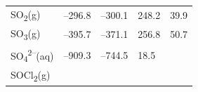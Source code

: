 \documentclass[
  9pt,
]{extbook}
\theoremstyle{definition}
\theoremstyle{definition}
\theoremstyle{definition}
\theoremstyle{remark}
\begin{document}
\begin{longtable}[]{@{}lllll@{}}
\begin{minipage}[t]{0.10\columnwidth}\raggedright
SO\textsubscript{2}(g)\strut
\end{minipage} & \begin{minipage}[t]{0.19\columnwidth}\raggedright
--296.8\strut
\end{minipage} & \begin{minipage}[t]{0.20\columnwidth}\raggedright
--300.1\strut
\end{minipage} & \begin{minipage}[t]{0.18\columnwidth}\raggedright
248.2\strut
\end{minipage} & \begin{minipage}[t]{0.18\columnwidth}\raggedright
39.9\strut
\end{minipage}\tabularnewline
\begin{minipage}[t]{0.10\columnwidth}\raggedright
SO\textsubscript{3}(g)\strut
\end{minipage} & \begin{minipage}[t]{0.19\columnwidth}\raggedright
--395.7\strut
\end{minipage} & \begin{minipage}[t]{0.20\columnwidth}\raggedright
--371.1\strut
\end{minipage} & \begin{minipage}[t]{0.18\columnwidth}\raggedright
256.8\strut
\end{minipage} & \begin{minipage}[t]{0.18\columnwidth}\raggedright
50.7\strut
\end{minipage}\tabularnewline
\begin{minipage}[t]{0.10\columnwidth}\raggedright
SO\textsubscript{4}\textsuperscript{2--}(aq)\strut
\end{minipage} & \begin{minipage}[t]{0.19\columnwidth}\raggedright
--909.3\strut
\end{minipage} & \begin{minipage}[t]{0.20\columnwidth}\raggedright
--744.5\strut
\end{minipage} & \begin{minipage}[t]{0.18\columnwidth}\raggedright
18.5\strut
\end{minipage} & \begin{minipage}[t]{0.18\columnwidth}\raggedright
\strut
\end{minipage}\tabularnewline
\begin{minipage}[t]{0.10\columnwidth}\raggedright
SOCl\textsubscript{2}(g)\strut

\end{minipage}
\end{longtable}
\end{document}
